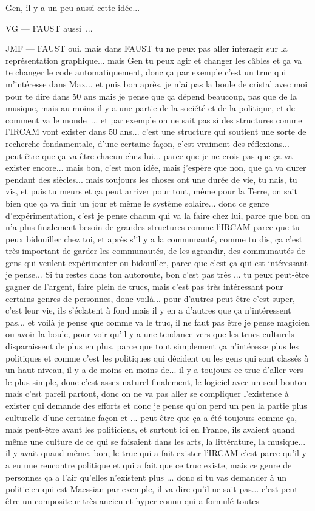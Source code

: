 Gen, il y a un peu aussi cette idée... 

VG — FAUST aussi ... 

JMF — FAUST oui, mais dans FAUST tu ne peux pas aller interagir sur la représentation graphique... mais Gen tu peux agir et changer les câbles et ça va te changer le code automatiquement, donc ça par exemple c'est un truc qui m'intéresse dans Max... et puis bon après, je n'ai pas la boule de cristal avec moi pour te dire dans 50 ans mais je pense que ça dépend beaucoup, pas que de la musique, mais au moins il y a une partie de la société et de la politique, et de comment va le monde ... et par exemple on ne sait pas si des structures comme l'IRCAM vont exister dans 50 ans... c'est une structure qui soutient une sorte de recherche fondamentale, d'une certaine façon, c'est vraiment des réflexions... peut-être que ça va être chacun chez lui... parce que je ne crois pas que ça va exister encore... mais bon, c'est mon idée, mais j'espère que non, que ça va durer pendant des siècles... mais toujours les choses ont une durée de vie, tu nais, tu vis, et puis tu meurs et ça peut arriver pour tout, même pour la Terre, on sait bien que ça va finir un jour et même le système solaire... donc ce genre d'expérimentation, c'est je pense chacun qui va la faire chez lui, parce que bon on n'a plus finalement besoin de grandes structures comme l'IRCAM parce que tu peux bidouiller chez toi, et après s'il y a la communauté, comme tu dis, ça c'est très important de garder les communautés, de les agrandir, des communautés de gens qui veulent expérimenter ou bidouiller, parce que c'est ça qui est intéressant je pense... Si tu restes dans ton autoroute, bon c'est pas très ... tu peux peut-être gagner de l'argent, faire plein de trucs, mais c'est pas très intéressant pour certains genres de personnes, donc voilà... pour d'autres peut-être c'est super, c'est leur vie, ils s'éclatent à fond mais il y en a d'autres que ça n'intéressent pas... et voilà je pense que comme va le truc, il ne faut pas être je pense magicien ou avoir la boule, pour voir qu'il y a une tendance vers que les trucs culturels disparaissent de plus en plus, parce que tout simplement ça n'intéresse plus les politiques et comme c'est les politiques qui décident ou les gens qui sont classés à un haut niveau, il y a de moins en moins de... il y a toujours ce truc d'aller vers le plus simple, donc c'est assez naturel finalement, le logiciel avec un seul bouton mais c'est pareil partout, donc on ne va pas aller se compliquer l'existence à exister qui demande des efforts et donc je pense qu'on perd un peu la partie plus culturelle d'une certaine façon et ... peut-être que ça a été toujours comme ça, mais peut-être avant les politiciens, et surtout ici en France, ils avaient quand même une culture de ce qui se faisaient dans les arts, la littérature, la musique... il y avait quand même, bon, le truc qui a fait exister l'IRCAM c'est parce qu'il y a eu une rencontre politique et qui a fait que ce truc existe, mais ce genre de personnes ça a l'air qu'elles n'existent plus ... donc si tu vas demander à un politicien qui est Maessian par exemple, il va dire qu'il ne sait pas... c'est peut-être un compositeur très ancien et hyper connu qui a formulé toutes 